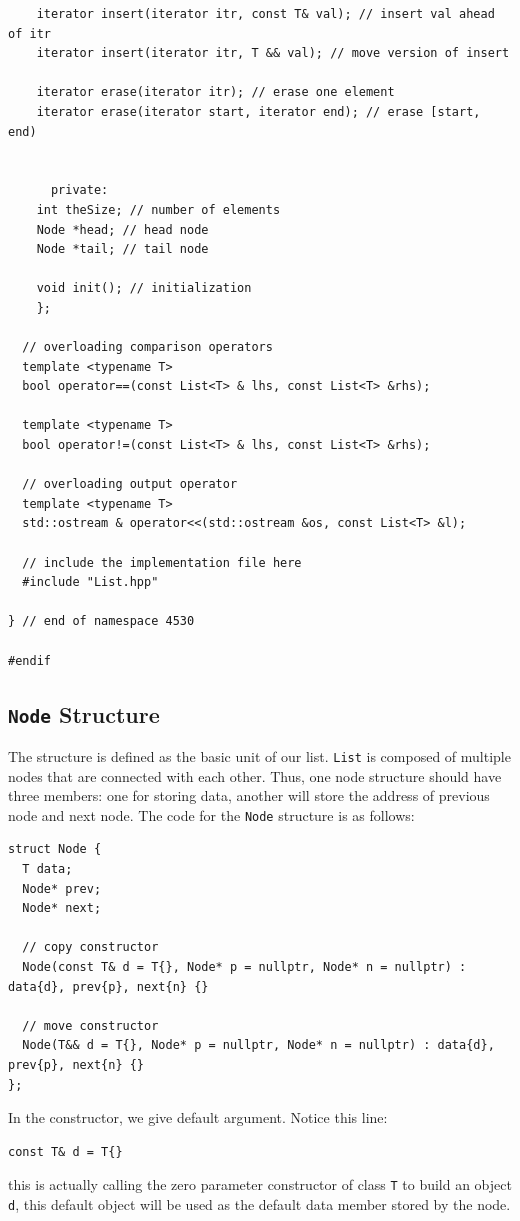 \documentclass[11pt]{book}
\begin{document}
\begin{verbatim}
	iterator insert(iterator itr, const T& val); // insert val ahead of itr
	iterator insert(iterator itr, T && val); // move version of insert

	iterator erase(iterator itr); // erase one element
	iterator erase(iterator start, iterator end); // erase [start, end)


      private:
	int theSize; // number of elements
	Node *head; // head node
	Node *tail; // tail node

	void init(); // initialization
    };

  // overloading comparison operators
  template <typename T>
  bool operator==(const List<T> & lhs, const List<T> &rhs);

  template <typename T>
  bool operator!=(const List<T> & lhs, const List<T> &rhs);

  // overloading output operator
  template <typename T>
  std::ostream & operator<<(std::ostream &os, const List<T> &l);

  // include the implementation file here
  #include "List.hpp"

} // end of namespace 4530

#endif

\end{verbatim}
\subsection{\texttt{Node} Structure}
\label{sec:org4a7aecd}
The structure is defined as the basic unit of our list. \texttt{List} is composed of multiple nodes that are connected with each other. Thus, one node structure should have three members: one for storing data, another will store the address of previous node and next node. The code for the \texttt{Node} structure is as follows:
\begin{verbatim}
struct Node {
  T data;
  Node* prev;
  Node* next;

  // copy constructor
  Node(const T& d = T{}, Node* p = nullptr, Node* n = nullptr) : data{d}, prev{p}, next{n} {}

  // move constructor
  Node(T&& d = T{}, Node* p = nullptr, Node* n = nullptr) : data{d}, prev{p}, next{n} {}
};
\end{verbatim}

In the constructor, we give default argument. Notice this line:
\begin{verbatim}
const T& d = T{}
\end{verbatim}
this is actually calling the zero parameter constructor of class \texttt{T} to build an object \texttt{d}, this default object will be used as the default data member stored by the node.
\end{document}
